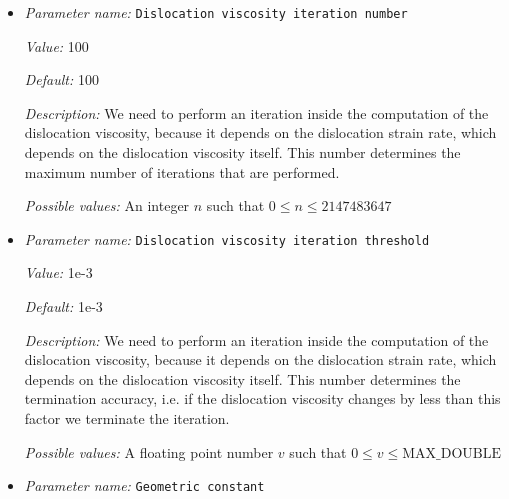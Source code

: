 \begin{itemize}
{\it Value:} 4.5e-15


{\it Default:} 4.5e-15


{\it Description:} The prefactor for the dislocation creep law $A_{dis}$. Units: $Pa^{-n_{dis}}/s$.


{\it Possible values:} A list of 0 to 4294967295 elements where each element is [A floating point number $v$ such that $0 \leq v \leq \text{MAX\_DOUBLE}$]
\item {\it Parameter name:} {\tt Dislocation viscosity iteration number}
\label{parameters:Material model/Grain size model/Dislocation viscosity iteration number}


{\it Value:} 100


{\it Default:} 100


{\it Description:} We need to perform an iteration inside the computation of the dislocation viscosity, because it depends on the dislocation strain rate, which depends on the dislocation viscosity itself. This number determines the maximum number of iterations that are performed. 


{\it Possible values:} An integer $n$ such that $0\leq n \leq 2147483647$
\item {\it Parameter name:} {\tt Dislocation viscosity iteration threshold}
\label{parameters:Material model/Grain size model/Dislocation viscosity iteration threshold}


{\it Value:} 1e-3


{\it Default:} 1e-3


{\it Description:} We need to perform an iteration inside the computation of the dislocation viscosity, because it depends on the dislocation strain rate, which depends on the dislocation viscosity itself. This number determines the termination accuracy, i.e. if the dislocation viscosity changes by less than this factor we terminate the iteration.


{\it Possible values:} A floating point number $v$ such that $0 \leq v \leq \text{MAX\_DOUBLE}$
\item {\it Parameter name:} {\tt Geometric constant}
\label{parameters:Material model/Grain size model/Geometric constant}



\end{itemize}
